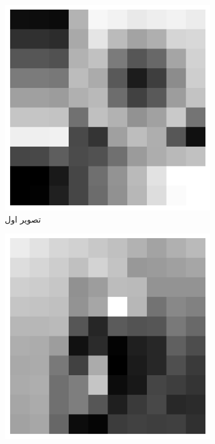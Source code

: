         \begin{figure}[htbp]
            \centering
            \captionsetup{width=.9\linewidth}
            \begin{subfigure}[b]{0.35\textwidth}
                \centering
                \includegraphics[width=\textwidth]{images/slop-resized.jpg}
                \caption{تصویر اول}
                \label{fig:part3-input-image1}
            \end{subfigure}
            \hfill
            \begin{subfigure}[b]{0.35\textwidth}
                \centering
                \includegraphics[width=\textwidth]{images/bird-resized.jpg}

\end{subfigure}
\end{figure}
